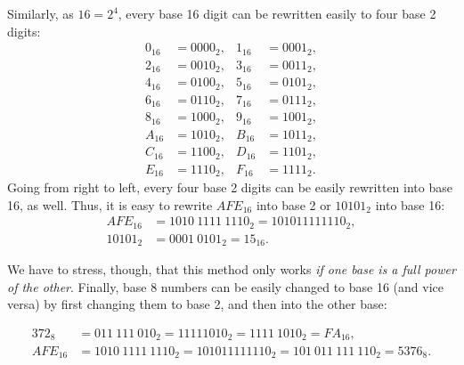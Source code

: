 Similarly, 
as $16 = 2^4$, 
every base 16 digit can be rewritten easily to four base 2 digits: 
\begin{align*}
0_{16} &= 0000_2, & 1_{16} &= 0001_2, \\
2_{16} &= 0010_2, & 3_{16} &= 0011_2, \\
4_{16} &= 0100_2, & 5_{16} &= 0101_2, \\
6_{16} &= 0110_2, & 7_{16} &= 0111_2, \\
8_{16} &= 1000_2, & 9_{16} &= 1001_2, \\
A_{16} &= 1010_2, & B_{16} &= 1011_2, \\
C_{16} &= 1100_2, & D_{16} &= 1101_2, \\
E_{16} &= 1110_2, & F_{16} &= 1111_2. 
\end{align*}
Going from right to left, 
every four base 2 digits can be easily rewritten into base 16, as well. 
Thus, it is easy to rewrite $AFE_{16}$ into base 2 or $10101_2$ into base 16: 
\begin{align*}
AFE_{16} &= 1010~1111~1110_2 = 101011111110_2, \\
10101_2 &= 0001~0101_2 = 15_{16}. 
\end{align*}

We have to stress, though, that this method only works \emph{if one base is a full power of the other}. 
Finally, base 8 numbers can be easily changed to base 16 (and vice versa) by first changing them to base 2, 
and then into the other base: 

\begin{align*}
372_8 &= 011~111~010_2 = 11111010_2 = 1111~1010_2 = FA_{16}, \\
AFE_{16} &= 1010~1111~1110_2 = 101011111110_2 = 101~011~111~110_2 = 5376_8. 
\end{align*}

